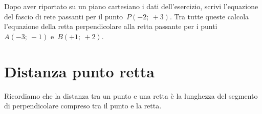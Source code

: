  \begin{esempio}
  Dopo aver riportato su un piano cartesiano i dati dell'esercizio,
  scrivi l'equazione del fascio di rete passanti per il punto~\(P(-2;~+3)\).
  Tra tutte queste calcola l'equazione della retta perpendicolare alla retta 
  passante per i punti~\(A(-3;~-1)\) e~\(B(+1;~+2)\).

\begin{inaccessibleblock}
 \begin{figure}[h]
 \centering
{}
\label{fig:metodorapido}
\end{figure}
\end{inaccessibleblock}
 \end{esempio}

\section{Distanza punto retta}
\label{sec:retta_distanzapuntoretta}

Ricordiamo che la distanza tra un punto e una retta è la lunghezza del 
segmento di perpendicolare compreso tra il punto e la retta.


